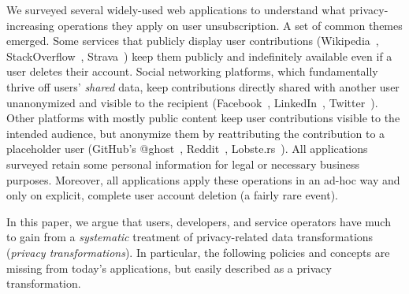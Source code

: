 %
We surveyed several widely-used web applications to understand what privacy-increasing operations
they apply on user unsubscription.
%
A set of common themes emerged.
%
Some services that publicly display user contributions (\eg Wikipedia~\cite{wikipedia:privacy},
StackOverflow~\cite{stackoverflow:privacy}, Strava~\cite{strava:privacy}) keep them publicly
and indefinitely available even if a user deletes their account.
%
Social networking platforms, which fundamentally thrive off users' \emph{shared} data, keep
contributions directly shared with another user unanonymized and visible to the recipient
(\eg Facebook~\cite{facebook:privacy}, LinkedIn~\cite{linkedin:privacy},
Twitter~\cite{twitter:privacy}).
%
Other platforms with mostly public content keep user contributions visible to the intended
audience, but anonymize them by reattributing the contribution to a placeholder user
(\eg GitHub's @ghost~\cite{github:privacy}, Reddit~\cite{reddit:privacy},
Lobste.rs~\cite{lobsters:privacy}).
%
%
All applications surveyed retain some personal information for legal or necessary business
purposes.
%
Moreover, all applications apply these operations in an ad-hoc way  and only on explicit, complete user account deletion (a fairly rare event).
%

%
In this paper, we argue that users, developers, and service operators have much to gain from a
\emph{systematic} treatment of privacy-related data transformations (\emph{privacy
transformations}).
%
In particular, the following policies and concepts are missing from today's applications, but
easily described as a privacy transformation.
%

